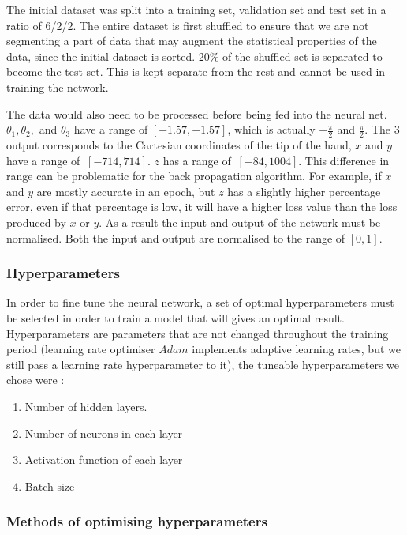 \documentclass{article}
\begin{document}
The initial dataset was split into a training set, validation set and test set in a ratio of 6/2/2. The entire dataset is first shuffled to ensure that we are not segmenting a part of data that may augment the statistical properties of the data, since the initial dataset is sorted. 20\% of the shuffled set is separated to become the test set. This is kept separate from the rest and cannot be used in training the network.

The data would also need to be processed before being fed into the neural net. $\theta_{1}, \theta_{2},$ and $\theta_{3}$
 have a range of $[-1.57, +1.57]$, which is actually $-\frac{\pi}{2}$ and $\frac{\pi}{2}$. The 3 output corresponds to the Cartesian coordinates of the tip of the hand, $x$ and $y$ have a range of $~[-714, 714]$. $z$ has a range of $~[-84, 1004]$. This difference in range can be problematic for the back propagation algorithm. For example, if $x$ and $y$ are mostly accurate in an epoch, but $z$ has a slightly higher percentage error, even if that percentage is low, it will have a higher loss value than the loss produced by $x$ or $y$. As a result the input and output of the network must be normalised. Both the input and output are normalised to the range of $[0,1]$.
 
\subsubsection{Hyperparameters}
In order to fine tune the neural network, a set of optimal hyperparameters must be selected in order to train a model that will gives an optimal result. Hyperparameters are parameters that are not changed throughout the training period (learning rate optimiser $Adam$ implements adaptive learning rates, but we still pass a learning rate hyperparameter to it), the tuneable hyperparameters we chose were :
\begin{enumerate}
    \item   Number of hidden layers.
    \item   Number of neurons in each layer
    \item   Activation function of each layer
    \item   Batch size
\end{enumerate}

\subsubsection{Methods of optimising hyperparameters}
\end{document}
